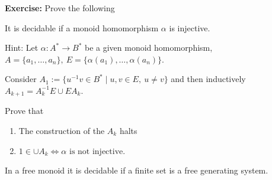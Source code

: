 {\bf Exercise:} Prove the following 
\begin{theorem}
It is decidable if a monoid homomorphism $\alpha$ is injective.
\end{theorem}

Hint: Let $\alpha: A^* \to B^*$ be a given monoid homomorphism, $A =
\{a_1,\ldots,a_n\},\ E = \{\alpha(a_1),\ldots,\alpha(a_n)\}$.

Consider $A_1 := \{ u^{-1} v \in B^* \mid u, v \in E,\ u\neq v \}$ and then
inductively $A_{k+1} = A_k^{-1} E \cup E A_k$.

Prove that
\begin{enumerate}
  \item The construction of the $A_k$ halts
  \item $1 \in \cup A_k \iff \alpha\text{ is not injective}$.
\end{enumerate}


\begin{corollary}
In a free monoid it is decidable if a finite set is a free generating system.
\end{corollary}
